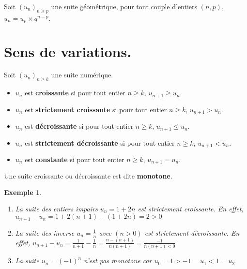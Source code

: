 \documentclass[a4paper,11pt]{article}
\theoremstyle{break}
\newcounter{enonce}
\newtheorem{exemple}[enonce]{Exemple}
\begin{document}
   \begin{theorem}
    Soit $(u_n)_{n \geq p}$ une suite géométrique, pour tout couple d'entiers $(n,p)$, $u_n=u_p\times q^{n-p}$.
   \end{theorem}

   
   \newpage
   
    \section{Sens de variations.}
  
  \begin{definition}
    
   Soit $(u_n)_{n \geq k}$ une suite numérique.
   
   \begin{itemize}
    \item $u_n$ est \textbf{croissante} si pour tout entier $n \geq k$, $u_{n+1} \geq u_n$.
   \item $u_n$ est \textbf{strictement croissante} si pour tout entier $n \geq k$, $u_{n+1} > u_n$.
   \item $u_n$ est \textbf{décroissante} si pour tout entier $n \geq k$, $u_{n+1} \leq u_n$.
   \item $u_n$ est \textbf{strictement décroissante} si pour tout entier $n \geq k$, $u_{n+1} < u_n$.
   \item $u_n$ est \textbf{constante} si pour tout entier $n \geq k$, $u_{n+1} = u_n$. 
   \end{itemize}
   Une suite croissante ou décroissante est dite \textbf{monotone}.
     
  \end{definition}
  
   \begin{exemple}
    
    \begin{enumerate}
          \item La suite des entiers impairs $u_n=1+2n$ est strictement croissante. En effet, 
     $u_{n+1}-u_n=1+2(n+1)-(1+2n)=2>0$
     \item La suite des inverse $u_n=\frac{1}{n}$ avec $(n>0)$ est strictement décroissante. En effet,
     $u_{n+1}-u_n=\frac{1}{n+1}-\frac{1}{n}=\frac{n-(n+1)}{n(n+1)}=\frac{-1}{n(n+1)<0}$
     
     \item La suite $u_n=(-1)^n$ n'est pas monotone car $u_0=1>-1=u_1<1=u_2$
    \end{enumerate}
 \end{exemple}
 
\end{document}

